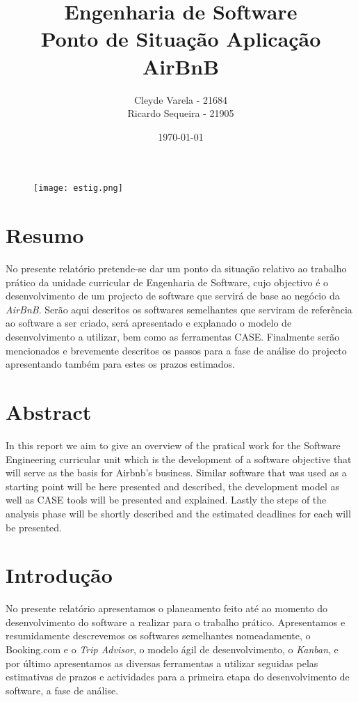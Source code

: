 \documentclass[a4paper]{article}
\title{Engenharia de Software\\Ponto de Situação Aplicação AirBnB} %
\author{Cleyde Varela - 21684 \\ Ricardo Sequeira - 21905} %
\date{\today}
\begin{document}
\maketitle
\begin{figure}[!t]
    \texttt{[image: estig.png]}
\end{figure}

\newpage
\section{Resumo}
No presente relatório pretende-se dar um ponto da situação relativo ao trabalho prático da unidade curricular de Engenharia de Software, cujo objectivo é o desenvolvimento de um projecto de software que servirá de base ao negócio da \textit{AirBnB}.
Serão aqui descritos os softwares semelhantes que serviram de referência ao software a ser criado, será apresentado e explanado o modelo de desenvolvimento a utilizar, bem como as ferramentas CASE. Finalmente serão mencionados e brevemente descritos os passos para a fase de análise do projecto apresentando também para estes os prazos estimados.
\newpage

\section{Abstract}
In this report we aim to give an overview of the pratical work for the Software Engineering curricular unit which is the development of a software objective that will serve as the basis for Airbnb's business. 
Similar software that was used as a starting point will be here presented and described, the development model as well as CASE tools will be presented and explained. Lastly the steps of the analysis phase will be shortly described and the estimated deadlines for each will be presented.

\newpage
\tableofcontents
\newpage

\section{Introdução}
No presente relatório apresentamos o planeamento feito até ao momento do desenvolvimento do software a realizar para o trabalho prático. Apresentamos e resumidamente descrevemos os softwares semelhantes nomeadamente, o Booking.com e o \textit{Trip Advisor}, o modelo ágil de desenvolvimento, o \textit{Kanban}, e por último apresentamos as diversas ferramentas a utilizar seguidas pelas estimativas de prazos e actividades para a primeira etapa do desenvolvimento de software, a fase de análise.
\newpage
\end{document}
